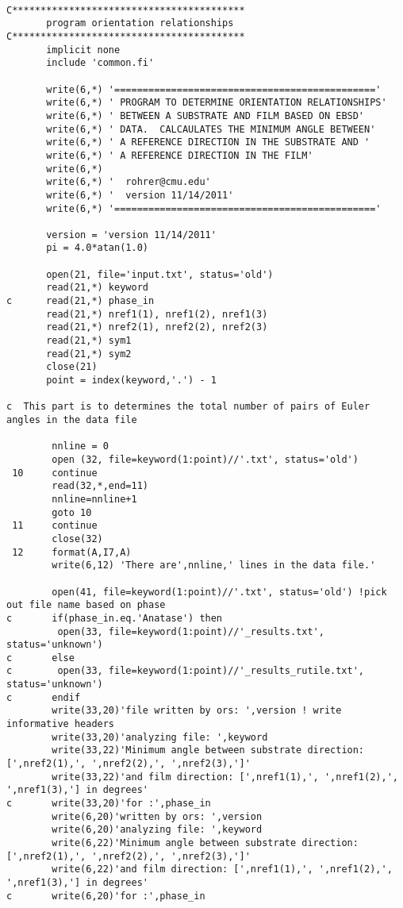 \ttfamily
\begin{lstlisting}

C*****************************************
       program orientation relationships
C*****************************************
       implicit none
	   include 'common.fi'

       write(6,*) '=============================================='
	   write(6,*) ' PROGRAM TO DETERMINE ORIENTATION RELATIONSHIPS'
	   write(6,*) ' BETWEEN A SUBSTRATE AND FILM BASED ON EBSD'
	   write(6,*) ' DATA.  CALCAULATES THE MINIMUM ANGLE BETWEEN'	   
	   write(6,*) ' A REFERENCE DIRECTION IN THE SUBSTRATE AND '	  
	   write(6,*) ' A REFERENCE DIRECTION IN THE FILM'	  
	   write(6,*)
	   write(6,*) '  rohrer@cmu.edu'
	   write(6,*) '  version 11/14/2011'
       write(6,*) '=============================================='
	   
	   version = 'version 11/14/2011'
       pi = 4.0*atan(1.0)

       open(21, file='input.txt', status='old')
	   read(21,*) keyword
c	   read(21,*) phase_in       
	   read(21,*) nref1(1), nref1(2), nref1(3)
	   read(21,*) nref2(1), nref2(2), nref2(3)	 
	   read(21,*) sym1	
	   read(21,*) sym2		   
	   close(21)  
	   point = index(keyword,'.') - 1	

c  This part is to determines the total number of pairs of Euler angles in the data file

		nnline = 0
        open (32, file=keyword(1:point)//'.txt', status='old')
 10     continue
		read(32,*,end=11)
		nnline=nnline+1
		goto 10
 11     continue
        close(32)
 12    	format(A,I7,A)
		write(6,12) 'There are',nnline,' lines in the data file.'

		open(41, file=keyword(1:point)//'.txt', status='old') !pick out file name based on phase
c		if(phase_in.eq.'Anatase') then
	     open(33, file=keyword(1:point)//'_results.txt', status='unknown')
c		else
c        open(33, file=keyword(1:point)//'_results_rutile.txt', status='unknown')
c		endif 
        write(33,20)'file written by ors: ',version ! write informative headers
		write(33,20)'analyzing file: ',keyword
        write(33,22)'Minimum angle between substrate direction: [',nref2(1),', ',nref2(2),', ',nref2(3),']'
        write(33,22)'and film direction: [',nref1(1),', ',nref1(2),', ',nref1(3),'] in degrees'
c		write(33,20)'for :',phase_in
        write(6,20)'written by ors: ',version
		write(6,20)'analyzing file: ',keyword
        write(6,22)'Minimum angle between substrate direction: [',nref2(1),', ',nref2(2),', ',nref2(3),']'
        write(6,22)'and film direction: [',nref1(1),', ',nref1(2),', ',nref1(3),'] in degrees'
c		write(6,20)'for :',phase_in 


\end{lstlisting}
